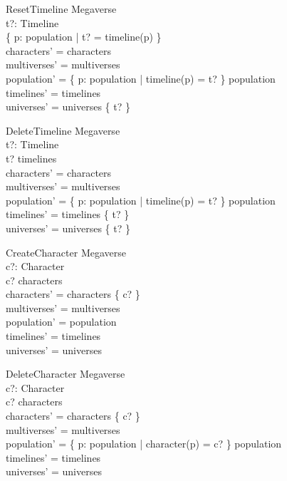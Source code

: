 \documentclass{article}
\begin{document}
\begin{schema}{ResetTimeline}
\Delta Megaverse \\
t?: Timeline \\
\where
\{ p: \dom population | t? = timeline(p) \} \neq \emptyset \\
characters' = characters \\ 
multiverses' = multiverses \\
population' = \{ p: \dom population | timeline(p) = t? \} \ndres population \\
timelines' = timelines \\
universes' = universes \nrres \{ t? \} \\
\end{schema}

\begin{schema}{DeleteTimeline}
\Delta Megaverse \\
t?: Timeline \\
\where
t? \in timelines \\
characters' = characters \\ 
multiverses' = multiverses \\
population' = \{ p: \dom population | timeline(p) = t? \} \ndres population \\
timelines' = timelines \setminus \{ t? \} \\
universes' = universes \nrres \{ t? \} \\
\end{schema}

\begin{schema}{CreateCharacter}
\Delta Megaverse \\
c?: Character \\
\where 
c? \notin characters \\
characters' = characters \cup \{ c? \} \\
multiverses' = multiverses \\
population' = population \\
timelines' = timelines \\
universes' = universes \\
\end{schema}

\begin{schema}{DeleteCharacter}
\Delta Megaverse \\
c?: Character \\
\where 
c? \in characters \\
characters' = characters \setminus \{ c? \} \\
multiverses' = multiverses \\
population' = \{ p: \dom population | character(p) = c? \} \ndres population \\
timelines' = timelines \\
universes' = universes \\
\end{schema}
\end{document}
